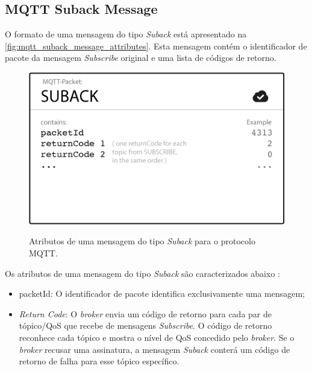 \subsection{MQTT Suback Message}\label{subsection:mqtt_suback_message}

O formato de uma mensagem do tipo \textit{Suback} está apresentado na \autoref{fig:mqtt_suback_message_attributes}. Esta mensagem contém o identificador de pacote da mensagem \textit{Subscribe} original e uma lista de códigos de retorno.

\begin{figure}[htbp]
    \centering
    \caption{Atributos de uma mensagem do tipo \textit{Suback} para o protocolo MQTT.}
    \includegraphics[scale=0.5]{Imagens/mqtt_suback_message_attributes.png}
    \label{fig:mqtt_suback_message_attributes}
\end{figure}

Os atributos de uma mensagem do tipo \textit{Suback} são caracterizados abaixo \cite{ref:026}:

\begin{itemize}
    \item packetId: O identificador de pacote identifica exclusivamente uma mensagem;
    \item \textit{Return Code}: O \textit{broker} envia um código de retorno para cada par de tópico/QoS que recebe de mensagens \textit{Subscribe}. O código de retorno reconhece cada tópico e mostra o nível de QoS concedido pelo \textit{broker}. Se o \textit{broker} recusar uma assinatura, a mensagem \textit{Suback} conterá um código de retorno de falha para esse tópico específico.
\end{itemize}

